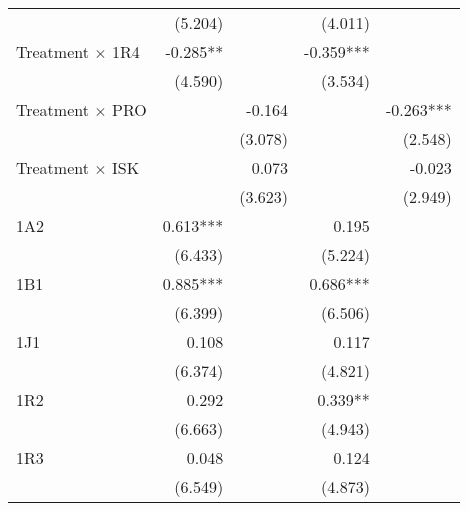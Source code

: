 \begin{table}[htbp]
\begin{tabular}{l*{4}{D{.}{.}{-1}}}
					&             (5.204)   &                       &             (4.011)   &                       \\
Treatment $\times$ 1R4&              -0.285** &                     &            -0.359***&                         \\
					&             (4.590)   &                       &             (3.534)   &                       \\
Treatment $\times$ PRO&                       &             -0.164  &                     &              -0.263*** \\
					&                       &             (3.078)   &                       &             (2.548)   \\
Treatment $\times$ ISK&                       &               0.073 &                     &                -0.023 \\
					&                       &             (3.623)   &                       &             (2.949)   \\
1A2                &               0.613***&                        &               0.195   &                       \\
                    &             (6.433)   &                       &             (5.224)   &                       \\
1B1                 &               0.885***&                       &               0.686***&                       \\
                    &             (6.399)   &                       &             (6.506)   &                       \\
1J1                 &               0.108   &                       &               0.117   &                       \\
                    &             (6.374)   &                       &             (4.821)   &                       \\
1R2                 &               0.292   &                       &               0.339** &                       \\
                    &             (6.663)   &                       &             (4.943)   &                       \\
1R3                &               0.048   &                        &               0.124   &                       \\
                    &             (6.549)   &                       &             (4.873)   &                       \\

\end{tabular}
\end{table}
